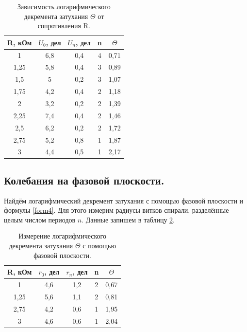 \documentclass[a4paper, 12pt, twoside]{article}
\begin{document}
\begin{table}[H]
	\centering
	\caption{Зависимость логарифмического декремента затухания $\Theta$ от сопротивления R.}
	\label{table2}
	\begin{tabular}{|c|c|c|c|c|}
		\hline
		R, кОм & $U_{0}$, дел & $U_{n}$, дел & n & $\Theta$   \\ \hline
		1      & 6,8     & 0,4     & 4 & 0,71    \\ \hline
		1,25   & 5,8     & 0,4     & 3 & 0,89    \\ \hline
		1,5    & 5       & 0,2     & 3 & 1,07    \\ \hline
		1,75   & 4,2     & 0,4     & 2 & 1,18    \\ \hline
		2      & 3,2     & 0,2     & 2 & 1,39    \\ \hline
		2,25   & 7,4     & 0,4     & 2 & 1,46    \\ \hline
		2,5    & 6,2     & 0,2     & 2 & 1,72    \\ \hline
		2,75   & 5,2     & 0,8     & 1 & 1,87   \\ \hline
		3      & 4,4     & 0,5     & 1 & 2,17    \\ \hline
	\end{tabular}
\end{table}

\subsection{Колебания на фазовой плоскости.}

Найдём логарифмический декремент затухания с помощью фазовой плоскости и формулы \ref{form4}. Для этого измерим радиусы витков спирали, разделённые целым числом периодов $n$. Данные запишем в таблицу \ref{table3}.

\begin{table}[H]
	\centering
	\caption{Измерение логарифмического декремента затухания $\Theta$ с помощью фазовой плоскости.}
	\label{table3}
	\begin{tabular}{|c|c|c|c|c|}
		\hline
		R, кОм & $r_{0}$, дел & $r_{n}$, дел & n &$\Theta$  \\ \hline
		1      & 4,6     & 1,2     & 2 & 0,67   \\ \hline
		1,25   & 5,6     & 1,1     & 2 & 0,81   \\ \hline
		2,75   & 4,2     & 0,6     & 1 & 1,95   \\ \hline
		3      & 4,6     & 0,6     & 1 & 2,04   \\ \hline
	\end{tabular}
\end{table}
\end{document}
